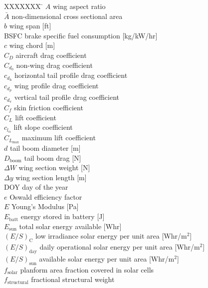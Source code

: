 \documentclass[]{aiaa-tc}%
\begin{document}
\begin{multicols}{2}
\small

\begin{tabbing}
  XXXXXXX \= \kill%
$A$ \> wing aspect ratio \\
$\bar{A}$ \> non-dimensional cross sectional area \\
$b$ \> wing span [ft] \\
BSFC \> brake specific fuel consumption [kg/kW/hr] \\
$c$ \> wing chord [m] \\
$C_D$ \> aircraft drag coefficient \\
$C_{d_0}$ \> non-wing drag coefficient \\
$c_{d_{\text{h}}}$ \> horizontal tail profile drag coefficient \\
$c_{d_p}$ \> wing profile drag coefficient \\
$c_{d_{\text{v}}}$ \> vertical tail profile drag coefficient \\
$C_f$ \> skin friction coefficient \\
$C_L$ \> lift coefficient \\
$c_{l_{\alpha}}$ \> lift slope coefficient \\
$C_{L_{\text{max}}}$ \> maximum lift coefficient \\
$d$ \> tail boom diameter [m] \\
$D_{\text{boom}}$ \> tail boom drag [N] \\
$\Delta W$ \> wing section weight [N] \\
$\Delta y$ \> wing section length [m] \\
DOY \> day of the year \\
$e$ \> Oswald efficiency factor \\
$E$ \> Young's Modulus [Pa] \\
$E_{\text{batt}}$ \> energy stored in battery [J] \\
$E_{\text{sun}}$ \> total solar energy available [Whr] \\
$(E/S)_{\text{C}}$ \> low irradiance solar energy per unit area [Whr/m$^2$] \\
$(E/S)_{\text{day}}$ \> daily operational solar energy per unit area [Whr/m$^2$] \\
$(E/S)_{\text{sun}}$ \> available solar energy per unit area [Whr/m$^2$] \\
$f_{\text{solar}}$ \> planform area fraction covered in solar cells \\
$f_{\text{structural}}$ \> fractional structural weight\\

\end{tabbing}
\end{multicols}
\end{document}
